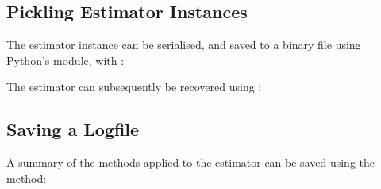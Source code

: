 \documentclass[letterpaper,10pt,english]{sphinxmanual}
\begin{document}
\subsection{Pickling Estimator Instances}
\label{\detokenize{walkthrough:pickling-estimator-instances}}
\sphinxAtStartPar
The estimator instance can be serialised, and saved to a binary file using
Python’s  module,
with {\hyperref[\detokenize{references/core:nmrespy.core.Estimator.to_pickle}]{}}:

\begin{sphinxVerbatim}[commandchars=\\\{\}]
\end{sphinxVerbatim}

\sphinxAtStartPar
The estimator can subsequently be recovered using
{\hyperref[\detokenize{references/core:nmrespy.core.Estimator.from_pickle}]{}}:

\begin{sphinxVerbatim}[commandchars=\\\{\}]
  
\end{sphinxVerbatim}


\subsection{Saving a Logfile}
\label{\detokenize{walkthrough:saving-a-logfile}}
\sphinxAtStartPar
A summary of the methods applied to the estimator can be saved using the
{\hyperref[\detokenize{references/core:nmrespy.core.Estimator.save_logfile}]{}} method:
\end{document}
